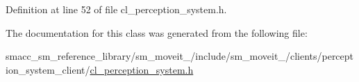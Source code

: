 Definition at line 52 of file cl\+\_\+perception\+\_\+system.\+h.



The documentation for this class was generated from the following file\+:\begin{DoxyCompactItemize}
\item 
smacc\+\_\+sm\+\_\+reference\+\_\+library/sm\+\_\+moveit\+\_/include/sm\+\_\+moveit\+\_/clients/perception\+\_\+system\+\_\+client/\hyperlink{4_2include_2sm__moveit__4_2clients_2perception__system__client_2cl__perception__system_8h}{cl\+\_\+perception\+\_\+system.\+h}\end{DoxyCompactItemize}
